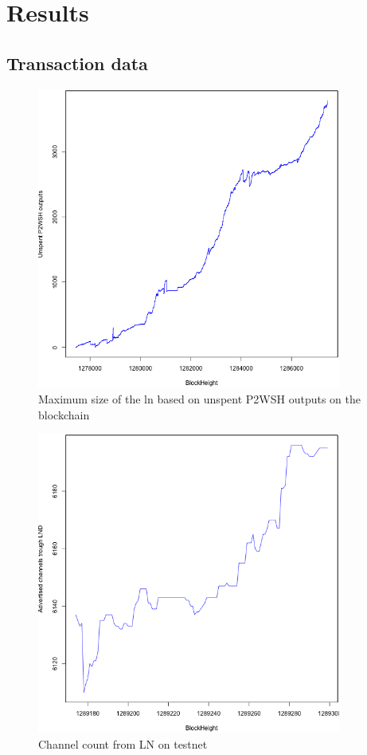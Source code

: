 \chapter{Results}
\label{chap:results}

\section{Transaction data}

\begin{figure}[h]
    \centering
    \includegraphics[width=10cm]{figures/bclnsizeTS.png}
    \caption{Maximum size of the ln based on unspent P2WSH outputs on the blockchain}
    \label{fig:htlc_bc}
\end{figure}

\begin{figure}[t]
    \centering
    \includegraphics[width=10cm]{figures/lnsizeTS.png}
    \caption{Channel count from LN on testnet}
    \label{fig:htlc_bc}
\end{figure}

